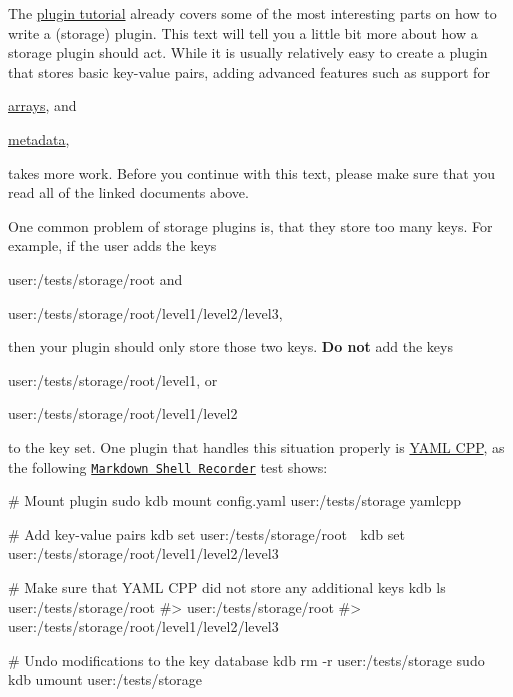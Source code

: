 The \hyperlink{doc_tutorials_plugins_md}{plugin tutorial} already covers some of the most interesting parts on how to write a (storage) plugin. This text will tell you a little bit more about how a storage plugin should act. While it is usually relatively easy to create a plugin that stores basic key-\/value pairs, adding advanced features such as support for


\begin{DoxyItemize}
\item \hyperlink{doc_tutorials_arrays_md}{arrays}, and
\item \hyperlink{doc_dev_metadata_md}{metadata},
\end{DoxyItemize}

takes more work. Before you continue with this text, please make sure that you read all of the linked documents above.

One common problem of storage plugins is, that they store too many keys. For example, if the user adds the keys


\begin{DoxyItemize}
\item {\ttfamily user\+:/tests/storage/root} and
\item {\ttfamily user\+:/tests/storage/root/level1/level2/level3},
\end{DoxyItemize}

then your plugin should only store those two keys. {\bfseries Do not} add the keys


\begin{DoxyItemize}
\item {\ttfamily user\+:/tests/storage/root/level1}, or
\item {\ttfamily user\+:/tests/storage/root/level1/level2}
\end{DoxyItemize}

to the key set. One plugin that handles this situation properly is \hyperlink{autotoc_md807_src_plugins_yamlcpp_README_md}{Y\+A\+ML C\+PP}, as the following \href{https://master.libelektra.org/tests/shell/shell_recorder/tutorial_wrapper}{\tt Markdown Shell Recorder} test shows\+:


\begin{DoxyCode}
# Mount plugin
sudo kdb mount config.yaml user:/tests/storage yamlcpp

# Add key-value pairs
kdb set user:/tests/storage/root 🐓
kdb set user:/tests/storage/root/level1/level2/level3 🐣

# Make sure that YAML CPP did not store any additional keys
kdb ls user:/tests/storage/root
#> user:/tests/storage/root
#> user:/tests/storage/root/level1/level2/level3

# Undo modifications to the key database
kdb rm -r user:/tests/storage
sudo kdb umount user:/tests/storage
\end{DoxyCode}


